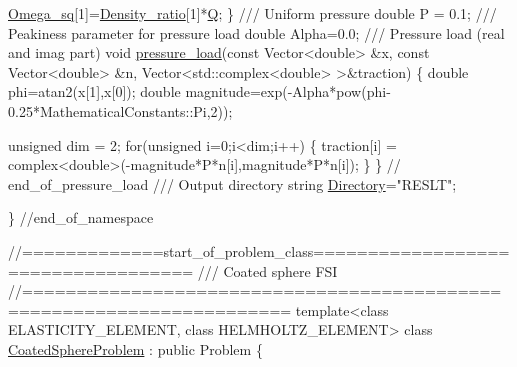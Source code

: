 \begin{DoxyCodeInclude}
  \hyperlink{namespaceGlobal__Parameters_a91314f7f1cc80c43543948568f50f405}{Omega\_sq}[1]=\hyperlink{namespaceGlobal__Parameters_a517d4c31b8bce6563c2f605266dd9679}{Density\_ratio}[1]*\hyperlink{namespaceGlobal__Parameters_a7814fddf663e56168174a42d2cd6b4c1}{Q};
 \}
\textcolor{comment}{}
\textcolor{comment}{ /// Uniform pressure}
\textcolor{comment}{} \textcolor{keywordtype}{double} P = 0.1;
\textcolor{comment}{}
\textcolor{comment}{ /// Peakiness parameter for pressure load}
\textcolor{comment}{} \textcolor{keywordtype}{double} Alpha=0.0; 
\textcolor{comment}{}
\textcolor{comment}{ /// Pressure load (real and imag part)}
\textcolor{comment}{} \textcolor{keywordtype}{void} \hyperlink{namespaceGlobal__Parameters_a0ddb3a77481b907fbb34f2e8d0a6eb9f}{pressure\_load}(\textcolor{keyword}{const} Vector<double> &x,
                    \textcolor{keyword}{const} Vector<double> &n, 
                    Vector<std::complex<double> >&traction)
 \{
  \textcolor{keywordtype}{double} phi=atan2(x[1],x[0]);
  \textcolor{keywordtype}{double} magnitude=exp(-Alpha*pow(phi-0.25*MathematicalConstants::Pi,2));

  \textcolor{keywordtype}{unsigned} dim = 2;
  \textcolor{keywordflow}{for}(\textcolor{keywordtype}{unsigned} i=0;i<dim;i++)
   \{
    traction[i] = complex<double>(-magnitude*P*n[i],magnitude*P*n[i]);
   \}
 \} \textcolor{comment}{// end\_of\_pressure\_load}
\textcolor{comment}{}
\textcolor{comment}{ /// Output directory}
\textcolor{comment}{} \textcolor{keywordtype}{string} \hyperlink{namespaceGlobal__Parameters_a301ab922df72030c660b21328d6caf76}{Directory}=\textcolor{stringliteral}{"RESLT"};
 
\} \textcolor{comment}{//end\_of\_namespace}



\textcolor{comment}{//=============start\_of\_problem\_class===================================}\textcolor{comment}{}
\textcolor{comment}{/// Coated sphere FSI}
\textcolor{comment}{}\textcolor{comment}{//====================================================================== }
\textcolor{keyword}{template}<\textcolor{keyword}{class} ELASTICITY\_ELEMENT, \textcolor{keyword}{class} HELMHOLTZ\_ELEMENT>
\textcolor{keyword}{class }\hyperlink{classCoatedSphereProblem}{CoatedSphereProblem} : \textcolor{keyword}{public} Problem
\{


\end{DoxyCodeInclude}
